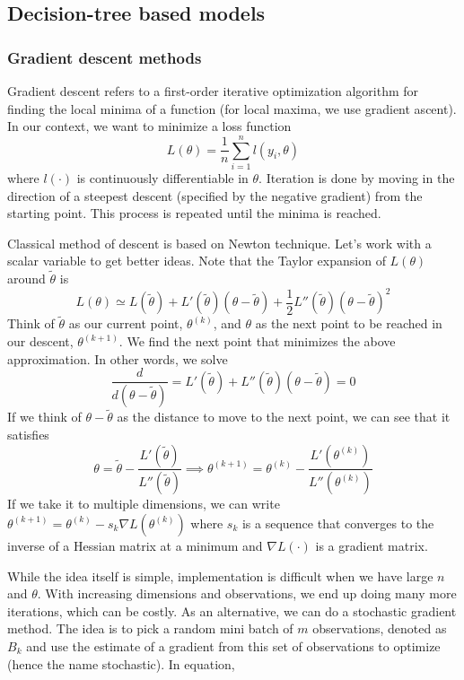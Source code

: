 \documentclass[12pt]{article}
\theoremstyle{definition}
\theoremstyle{property}
\theoremstyle{assumption}
\theoremstyle{example}
\theoremstyle{comment}
\begin{document}
\subsection{Decision-tree based models}

\subsubsection{Gradient descent methods}
Gradient descent refers to a first-order iterative optimization algorithm for finding the local minima of a function (for local maxima, we use gradient ascent). In our context, we want to minimize a loss function
\[
L(\theta) = \frac{1}{n}\sum_{i=1}^n l(y_i,\theta)
\]
where $l(\cdot)$ is continuously differentiable in $\theta$. Iteration is done by moving in the direction of a steepest descent (specified by the negative gradient) from the starting point. This process is repeated until the minima is reached. \par
Classical method of descent is based on Newton technique. Let's work with a scalar variable to get better ideas.  Note that the Taylor expansion of $L(\theta)$ around $\tilde{\theta}$ is
\[
L(\theta) \simeq L(\tilde{\theta})+L'(\tilde{\theta})(\theta-\tilde{\theta})+\frac{1}{2}L''(\tilde{\theta})(\theta-\tilde{\theta})^2
\]
Think of $\tilde{\theta}$ as our current point, $\theta^{(k)}$, and $\theta$ as the next point to be reached in our descent, $\theta^{(k+1)}$. We find the next point that minimizes the above approximation. In other words, we solve
\[
\frac{d}{d(\theta-\tilde{\theta})} = L'(\tilde{\theta}) + L''(\tilde{\theta})(\theta-\tilde{\theta})=0
\]
If we think of $\theta-\tilde{\theta}$ as the distance to move to the next point, we can see that it satisfies
\[
\theta= \tilde{\theta}-\frac{L'(\tilde{\theta})}{L''(\tilde{\theta})} \implies \theta^{(k+1)}= \theta^{(k)}-\frac{L'(\theta^{(k)})}{L''(\theta^{(k)})}
\]
If we take it to multiple dimensions, we can write $\theta^{(k+1)}= \theta^{(k)}-s_k \nabla L(\theta^{(k)})$ where $s_k$ is a sequence that converges to the inverse of a Hessian matrix at a minimum and $\nabla L(\cdot)$ is a gradient matrix. 
\par
While the idea itself is simple, implementation is difficult when we have large $n$ and $\theta$. With increasing dimensions and observations, we end up doing many more iterations, which can be costly. As an alternative, we can do a stochastic gradient method. The idea is to pick a random mini batch of $m$ observations, denoted as $B_k$ and use the estimate of a gradient from this set of observations to optimize (hence the name stochastic). In equation, 
\end{document}
